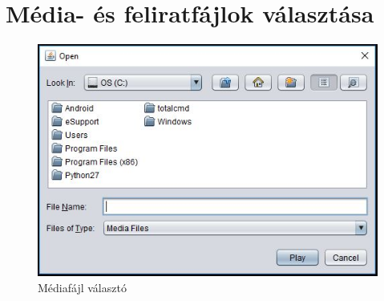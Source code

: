 \section{Média- és feliratfájlok választása}

\begin{figure}
  \includegraphics[width=\linewidth]{images/chooser_screen.jpg}
  \caption{Médiafájl választó}
  \label{fig:chooser_screen}
\end{figure}

